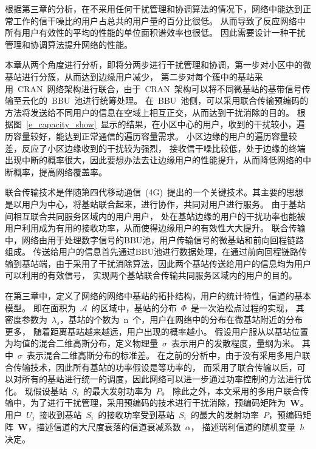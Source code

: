 

根据第三章的分析，在不采用任何干扰管理和协调算法的情况下，网络中能达到正常工作的信干噪比的用户占总共的用户量的百分比很低。
从而导致了反应网络中所有用户有效性的平均的性能的单位面积谱效率也很低。
因此需要设计一种干扰管理和协调算法提升网络的性能。

本章从两个角度进行分析，即将分两步进行干扰管理和协调，第一步对小区中的微基站进行分簇，从而达到边缘用户减少，
第二步对每个簇中的基站采用~CRAN~网络架构进行联合，由于~CRAN~架构可以将不同微基站的基带信号传输至云化的~BBU~池进行统筹处理。
在~BBU~池侧，可以采用联合传输预编码的方法将发送给不同用户的信息在空域上相互正交，从而达到干扰消除的目的。
根据图~\ref{e_capacity_show}~显示的结果，在小区中心的用户，收到的干扰较小，遍历容量较好，能达到正常通信的遍历容量需求。
小区边缘的用户的遍历容量较差，反应了小区边缘收到的干扰较为强烈，
接收信干噪比较低，处于边缘的终端出现中断的概率很大，因此要想办法去让边缘用户的性能提升，从而降低网络的中断概率，提高网络覆盖率。

联合传输技术是伴随第四代移动通信~(4G)~提出的一个关键技术。其主要的思想是以用户为中心，将基站联合起来，进行协作，共同对用户进行服务。
由于基站间相互联合共同服务区域内的用户用户，
处在基站边缘的用户的干扰功率也能被用户利用成为有用的接收功率，从而使得边缘用户的有效性大大提升。
联合传输中，网络由用于处理数字信号的BBU池，用户传输信号的微基站和前向回程链路组成。
传送给用户的信息首先通过BBU池进行数据处理，在通过前向回程链路传输到基站端，由于采用了干扰消除算法，因此两个基站传送给用户的信息均为用户可以利用的有效信号，
实现两个基站联合传输共同服务区域内的用户的目的。

在第三章中，定义了网络的网络中基站的拓扑结构，用户的统计特性，信道的基本模型。
即在面积为~$\mathcal{A}$~的区域中，基站的分布~$\Phi$~是一次泊松点过程的实现，
其密度参数为~$\lambda_s$，基站的个数为~n~个，用户在网络中的分布在微基站附近的分布更多，
随着距离基站越来越远，用户出现的概率越小。
假设用户服从以基站位置为均值的混合二维高斯分布，定义物理量~$\sigma$~表示用户的发散程度，量纲为米。
其中~$\sigma$~表示混合二维高斯分布的标准差。
在之前的分析中，由于没有采用多用户联合传输技术，因此所有基站的功率假设是等功率的，
而采用了联合传输以后，可以对所有的基站进行统一的调度，因此网络可以进一步通过功率控制的方法进行优化。
现假设基站~$S_i$~的最大发射功率为~$P$。
除此之外，本文采用的多用户联合传输中，为了进行干扰管理，采用预编码的技术进行干扰消除，预编码矩阵为~$\mathbf{W}$。
用户~$U_j$~接收到基站~$S_i$~的接收功率受到基站~$S_i$~的最大的发射功率~$P$，预编码矩阵~$\mathbf{W}$，描述信道的大尺度衰落的信道衰减系数~$\alpha$，
描述瑞利信道的随机变量~$h$决定。

